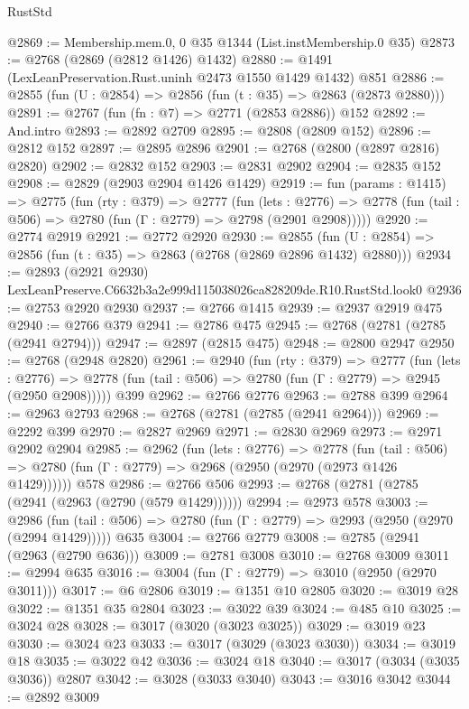 \begin{lexlean}{RustStd}
\begin{coremodule}
@2869 := Membership.mem.{0, 0} @35 @1344 (List.instMembership.{0} @35)
@2873 := @2768 (@2869 (@2812 @1426) @1432)
@2880 := @1491 (LexLeanPreservation.Rust.uninh @2473 @1550 @1429 @1432) @851
@2886 := @2855 (fun (U : @2854) => @2856 (fun (t : @35) => @2863 (@2873 @2880)))
@2891 := @2767 (fun (fn : @7) => @2771 (@2853 @2886)) @152
@2892 := And.intro
@2893 := @2892 @2709
@2895 := @2808 (@2809 @152)
@2896 := @2812 @152
@2897 := @2895 @2896
@2901 := @2768 (@2800 (@2897 @2816) @2820)
@2902 := @2832 @152
@2903 := @2831 @2902
@2904 := @2835 @152
@2908 := @2829 (@2903 @2904 @1426 @1429)
@2919 := fun (params : @1415) =>
  @2775
    (fun (rty : @379) =>
    @2777
      (fun (lets : @2776) =>
      @2778 (fun (tail : @506) => @2780 (fun (Γ : @2779) => @2798 (@2901 @2908)))))
@2920 := @2774 @2919
@2921 := @2772 @2920
@2930 := @2855 (fun (U : @2854) => @2856 (fun (t : @35) => @2863 (@2768 (@2869 @2896 @1432) @2880)))
@2934 := @2893 (@2921 @2930) LexLeanPreserve.C6632b3a2e999d115038026ca828209de.R10.RustStd.look0
@2936 := @2753 @2920 @2930
@2937 := @2766 @1415
@2939 := @2937 @2919 @475
@2940 := @2766 @379
@2941 := @2786 @475
@2945 := @2768 (@2781 (@2785 (@2941 @2794)))
@2947 := @2897 (@2815 @475)
@2948 := @2800 @2947
@2950 := @2768 (@2948 @2820)
@2961 := @2940
    (fun (rty : @379) =>
    @2777
      (fun (lets : @2776) =>
      @2778 (fun (tail : @506) => @2780 (fun (Γ : @2779) => @2945 (@2950 @2908)))))
    @399
@2962 := @2766 @2776
@2963 := @2788 @399
@2964 := @2963 @2793
@2968 := @2768 (@2781 (@2785 (@2941 @2964)))
@2969 := @2292 @399
@2970 := @2827 @2969
@2971 := @2830 @2969
@2973 := @2971 @2902 @2904
@2985 := @2962
    (fun (lets : @2776) =>
    @2778
      (fun (tail : @506) => @2780 (fun (Γ : @2779) => @2968 (@2950 (@2970 (@2973 @1426 @1429))))))
    @578
@2986 := @2766 @506
@2993 := @2768 (@2781 (@2785 (@2941 (@2963 (@2790 (@579 @1429))))))
@2994 := @2973 @578
@3003 := @2986
    (fun (tail : @506) => @2780 (fun (Γ : @2779) => @2993 (@2950 (@2970 (@2994 @1429)))))
    @635
@3004 := @2766 @2779
@3008 := @2785 (@2941 (@2963 (@2790 @636)))
@3009 := @2781 @3008
@3010 := @2768 @3009
@3011 := @2994 @635
@3016 := @3004 (fun (Γ : @2779) => @3010 (@2950 (@2970 @3011)))
@3017 := @6 @2806
@3019 := @1351 @10 @2805
@3020 := @3019 @28
@3022 := @1351 @35 @2804
@3023 := @3022 @39
@3024 := @485 @10
@3025 := @3024 @28
@3028 := @3017 (@3020 (@3023 @3025))
@3029 := @3019 @23
@3030 := @3024 @23
@3033 := @3017 (@3029 (@3023 @3030))
@3034 := @3019 @18
@3035 := @3022 @42
@3036 := @3024 @18
@3040 := @3017 (@3034 (@3035 @3036)) @2807
@3042 := @3028 (@3033 @3040)
@3043 := @3016 @3042
@3044 := @2892 @3009

\end{coremodule}
\end{lexlean}
